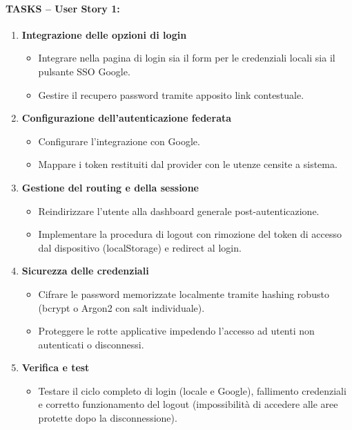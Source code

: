 \paragraph*{TASKS – User Story 1:}
\begin{enumerate}
    \item \textbf{Integrazione delle opzioni di login}
    \begin{itemize}
        \item Integrare nella pagina di login sia il form per le credenziali locali sia il pulsante SSO Google.
        \item Gestire il recupero password tramite apposito link contestuale.
    \end{itemize}

    \item \textbf{Configurazione dell'autenticazione federata}
    \begin{itemize}
        \item Configurare l'integrazione con Google.
        \item Mappare i token restituiti dal provider con le utenze censite a sistema.
    \end{itemize}

    \item \textbf{Gestione del routing e della sessione}
    \begin{itemize}
        \item Reindirizzare l'utente alla dashboard generale post-autenticazione.
        \item Implementare la procedura di logout con rimozione del token di accesso dal dispositivo (localStorage) e redirect al login.
    \end{itemize}

    \item \textbf{Sicurezza delle credenziali}
    \begin{itemize}
        \item Cifrare le password memorizzate localmente tramite hashing robusto (bcrypt o Argon2 con salt individuale).
        \item Proteggere le rotte applicative impedendo l'accesso ad utenti non autenticati o disconnessi.
    \end{itemize}

    \item \textbf{Verifica e test}
    \begin{itemize}
        \item Testare il ciclo completo di login (locale e Google), fallimento credenziali e corretto funzionamento del logout (impossibilità di accedere alle aree protette dopo la disconnessione).
    \end{itemize}
\end{enumerate}

